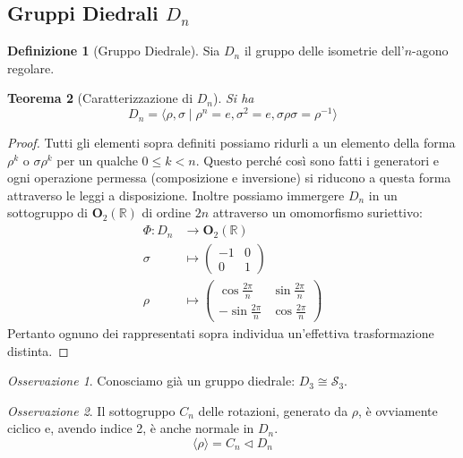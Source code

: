 \documentclass[a4paper]{article}
\newtheorem{theorem}{Teorema}[section]
\theoremstyle{remark}
\newtheorem*{remark}{Osservazione}
\theoremstyle{definition}
\newtheorem{definition}[theorem]{Definizione}
\begin{document}
\subsection{Gruppi Diedrali  $ D_n $}
\begin{multicols}{2}
\begin{definition}[Gruppo Diedrale]
	Sia $ D_n $ il gruppo delle isometrie dell'$ n $-agono regolare.
\end{definition}
\begin{theorem}[Caratterizzazione di $ D_n $]
	Si ha \[ D_n = \langle \rho, \sigma \mid \rho ^n = e, \sigma^2 = e, \sigma \rho \sigma = \rho^{-1} \rangle \]
\end{theorem}
\begin{proof}
	Tutti gli elementi sopra definiti possiamo ridurli a un elemento della forma $ \rho^k $ o $ \sigma \rho^k $ per un qualche $ 0 \leq k < n $. Questo perché così sono fatti i generatori e ogni operazione permessa (composizione e inversione) si riducono a questa forma attraverso le leggi a disposizione. Inoltre possiamo immergere $ D_n $ in un sottogruppo di $ \mathbf{O}_2(\mathbb{R}) $ di ordine $ 2n $ attraverso un omomorfismo suriettivo: \begin{align*}
	\Phi \colon D_n &\to \mathbf{O}_2(\mathbb{R}) \\
	\sigma &\mapsto \left(\begin{matrix}
	-1 & 0 \\
	0 & 1
	\end{matrix}\right) \\
	\rho &\mapsto \left(\begin{matrix}
	\cos\frac{2\pi}{n} & \sin\frac{2\pi}{n} \\
	-\sin\frac{2\pi}{n} & \cos\frac{2\pi}{n}
	\end{matrix}\right) 
	\end{align*}
	Pertanto ognuno dei rappresentati sopra individua un'effettiva trasformazione distinta.
\end{proof}

\begin{remark}
	Conosciamo già un gruppo diedrale: $ D_3 \cong \mathcal{S}_3 $.
\end{remark}
\begin{remark}
	Il sottogruppo $ C_n $ delle rotazioni, generato da $ \rho $, è ovviamente ciclico e, avendo indice 2, è anche normale in $ D_n $. $$ \langle \rho \rangle = C_n \lhd D_n $$
\end{remark}


\end{multicols}
\end{document}
